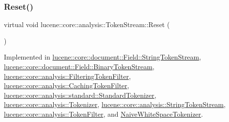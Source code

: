 \mbox{\label{classlucene_1_1core_1_1analysis_1_1TokenStream_ae24622f4bc0aeaf0bef924ff1661e023}} 
\subsubsection{\texorpdfstring{Reset()}{Reset()}}
{\footnotesize\ttfamily virtual void lucene\+::core\+::analysis\+::\+Token\+Stream\+::\+Reset (\begin{DoxyParamCaption}{ }\end{DoxyParamCaption})\hspace{0.3cm}{\ttfamily [pure virtual]}}



Implemented in \mbox{\hyperlink{classlucene_1_1core_1_1document_1_1Field_1_1StringTokenStream_a36e021820bb6ed2984c4f34f2f41a470}{lucene\+::core\+::document\+::\+Field\+::\+String\+Token\+Stream}}, \mbox{\hyperlink{classlucene_1_1core_1_1document_1_1Field_1_1BinaryTokenStream_adc2b2b0a6ea02054dfe5159628861911}{lucene\+::core\+::document\+::\+Field\+::\+Binary\+Token\+Stream}}, \mbox{\hyperlink{classlucene_1_1core_1_1analysis_1_1FilteringTokenFilter_ab85e4deab22d9dedd7ccb7b1f4750400}{lucene\+::core\+::analysis\+::\+Filtering\+Token\+Filter}}, \mbox{\hyperlink{classlucene_1_1core_1_1analysis_1_1CachingTokenFilter_adde877fb8c464d6eb2766bd400a1499c}{lucene\+::core\+::analysis\+::\+Caching\+Token\+Filter}}, \mbox{\hyperlink{classlucene_1_1core_1_1analysis_1_1standard_1_1StandardTokenizer_a4d6e42ca0fcaf07cb6615643362891b3}{lucene\+::core\+::analysis\+::standard\+::\+Standard\+Tokenizer}}, \mbox{\hyperlink{classlucene_1_1core_1_1analysis_1_1Tokenizer_a459d9c95a28f3b8aa3ad1cfde1568dd3}{lucene\+::core\+::analysis\+::\+Tokenizer}}, \mbox{\hyperlink{classlucene_1_1core_1_1analysis_1_1StringTokenStream_ab578e75921eb1757b4a8887cf29fe94d}{lucene\+::core\+::analysis\+::\+String\+Token\+Stream}}, \mbox{\hyperlink{classlucene_1_1core_1_1analysis_1_1TokenFilter_a0671ee825db7735a7b72b7a27a457ed9}{lucene\+::core\+::analysis\+::\+Token\+Filter}}, and \mbox{\hyperlink{classNaiveWhiteSpaceTokenizer_aa532e6a3e2fa6a9ebb90a4324179a30f}{Naive\+White\+Space\+Tokenizer}}.



